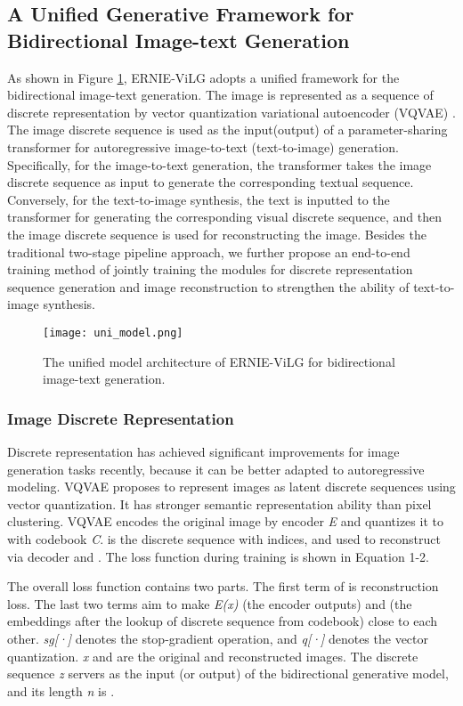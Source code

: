 \documentclass{article}
\begin{document}
\subsection{A Unified Generative Framework for Bidirectional Image-text Generation}
As shown in Figure \ref{fig:bimodel}, ERNIE-ViLG adopts a unified framework for the bidirectional image-text generation. The image is represented as a sequence of discrete representation by vector quantization variational autoencoder (VQVAE) \cite{oord2017neural}. 
The image discrete sequence is used as the input(output) of a parameter-sharing transformer for autoregressive image-to-text (text-to-image) generation.
Specifically, for the image-to-text generation, the transformer takes the image discrete sequence as input to generate the corresponding textual sequence. Conversely, for the text-to-image synthesis, the text is inputted to the transformer for generating the corresponding visual discrete sequence, and then the image discrete sequence is used for reconstructing the image. Besides the traditional two-stage pipeline approach, we further propose an end-to-end training method of jointly training the modules for discrete representation sequence generation and image reconstruction to strengthen the ability of text-to-image synthesis.
\begin{figure}[htb]
  \centering
  \texttt{[image: uni\_model.png]}
  \caption{The unified model architecture of ERNIE-ViLG for bidirectional image-text generation.}
  \label{fig:bimodel}
\end{figure}
\subsubsection{Image Discrete Representation}
Discrete representation has achieved significant improvements for image generation tasks recently, because it can be better adapted to autoregressive modeling. VQVAE \cite{oord2017neural} proposes to represent images as latent discrete sequences using vector quantization. It has stronger semantic representation ability than pixel clustering. VQVAE encodes the original image  by encoder \textit{E} and quantizes it to  with codebook \textit{C}.  is the discrete sequence with  indices, and used to reconstruct  via decoder  and . The loss function during training is shown in Equation 1-2.



The overall loss function contains two parts. The first term of  is reconstruction loss. The last two terms aim to make \textit{E(x)} (the encoder outputs) and  (the embeddings after the lookup of discrete sequence from codebook) close to each other.  \textit{sg[·]} denotes the stop-gradient operation, and \textit{q[·]} denotes the vector quantization. \textit{x} and  are the original and reconstructed images. The discrete sequence \textit{z} servers as the input (or output) of the bidirectional generative model, and its length \textit{n} is .
\end{document}
